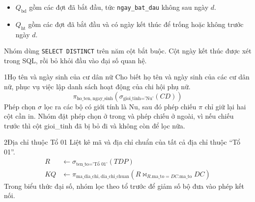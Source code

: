 \begin{itemize}[leftmargin=*, topsep=3pt, itemsep=3pt]
    \item $Q_{\mathrm{bd}}$ gồm các đợt đã bắt đầu, tức \texttt{ngay\_bat\_dau} không sau ngày $d$.
    \item $Q_{\mathrm{ht}}$ gồm các đợt đã bắt đầu và có ngày kết thúc để trống hoặc không trước ngày $d$.
\end{itemize}

Nhóm dùng \texttt{SELECT DISTINCT} trên năm cột bắt buộc. Cột ngày kết thúc được xét trong SQL, rồi bỏ khỏi đầu vào đại số quan hệ.

\begin{racau}{1}{Họ tên và ngày sinh của cư dân nữ}
Cho biết họ tên và ngày sinh của các cư dân nữ, phục vụ việc lập danh sách hoạt động của chi hội phụ nữ.
\begin{equation*}
\pi_{\text{ho\_ten},\ \text{ngay\_sinh}}\left(\sigma_{\text{gioi\_tinh} = \text{'Nu'}}(CD)\right)
\end{equation*}
Phép chọn $\sigma$ lọc ra các bộ có giới tính là Nu, sau đó phép chiếu $\pi$ chỉ giữ lại hai cột cần in. Nhóm đặt phép chọn ở trong và phép chiếu ở ngoài, vì nếu chiếu trước thì cột gioi\_tinh đã bị bỏ đi và không còn để lọc nữa.
\end{racau}

\begin{racau}{2}{Địa chỉ thuộc Tổ 01}
Liệt kê mã và địa chỉ chuẩn của tất cả địa chỉ thuộc ``Tổ 01''.
\begin{equation*}
\begin{aligned}
R &\leftarrow \sigma_{\text{ten\_to} = \text{'Tổ 01'}}(TDP)\\
KQ &\leftarrow \pi_{\text{ma\_dia\_chi},\ \text{dia\_chi\_chuan}}\left(R \bowtie_{R.\text{ma\_to} = DC.\text{ma\_to}} DC\right)
\end{aligned}
\end{equation*}
Trong biểu thức đại số, nhóm lọc theo tổ trước để giảm số bộ đưa vào phép kết nối.
\end{racau}

